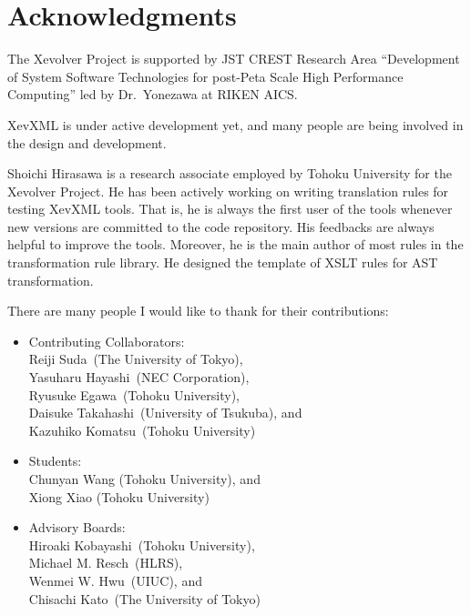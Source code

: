 \chapter*{Acknowledgments}

The Xevolver Project is supported by JST CREST Research Area
``Development of System Software Technologies for post-Peta Scale High
Performance Computing'' led by Dr.~Yonezawa at RIKEN AICS.

XevXML is under active development yet, and many people are being
involved in the design and development.

Shoichi Hirasawa is a research associate employed by Tohoku University
for the Xevolver Project.  He has been actively working on writing
translation rules for testing XevXML tools. That is, he is always the
first user of the tools whenever new versions are committed to the code
repository.  His feedbacks are always helpful to improve the
tools. Moreover, he is the main author of most rules in the
transformation rule library. He designed the template of XSLT rules for
AST transformation.


There are many people I would like to thank for their contributions:
\begin{itemize}
 \item Contributing Collaborators: \\
       Reiji Suda~(The University of Tokyo),\\
       Yasuharu Hayashi~(NEC Corporation),\\
       Ryusuke Egawa~(Tohoku University),\\
       Daisuke Takahashi~(University of Tsukuba), and \\
       Kazuhiko Komatsu~(Tohoku University)

 \item Students: \\
       Chunyan Wang (Tohoku University), and\\
       Xiong Xiao (Tohoku University)

 \item Advisory Boards:\\
       Hiroaki Kobayashi~(Tohoku University),\\
       Michael M. Resch~(HLRS),\\
       Wenmei W. Hwu~(UIUC), and\\
       Chisachi Kato~(The University of Tokyo)
\end{itemize}


